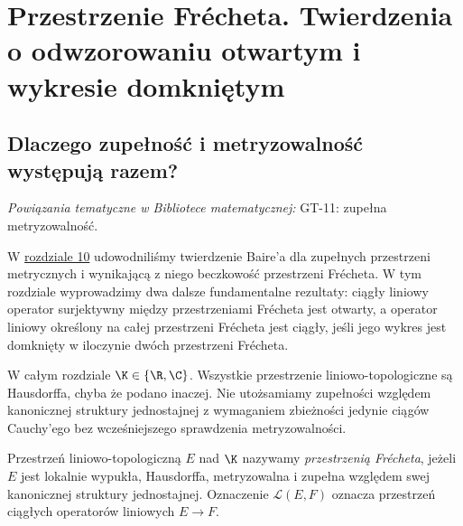 \setcounter{section}{10}
\section{Przestrzenie Frécheta. Twierdzenia o odwzorowaniu otwartym i wykresie domkniętym}\label{sec:frechet-open-graph}

\providecommand{\atlasref}[2]{#2}


\subsection{Dlaczego zupełność i metryzowalność występują razem?}

\noindent\emph{Powiązania tematyczne w Bibliotece matematycznej:} \atlasref{GT-11::def:topog-baire-zupelna-metryzowalnosc}{GT-11: zupełna metryzowalność}.


W \hyperref[sec:beczkowe-bornologiczne]{rozdziale 10} udowodniliśmy twierdzenie
Baire'a dla zupełnych przestrzeni metrycznych i wynikającą z niego
beczkowość przestrzeni Frécheta. W tym rozdziale wyprowadzimy dwa dalsze
fundamentalne rezultaty: ciągły liniowy operator surjektywny między
przestrzeniami Frécheta jest otwarty, a operator liniowy określony na
całej przestrzeni Frécheta jest ciągły, jeśli jego wykres jest domknięty
w iloczynie dwóch przestrzeni Frécheta.

W całym rozdziale $\K\in\{\R,\C\}$. Wszystkie przestrzenie
liniowo-topologiczne są Hausdorffa, chyba że podano inaczej.
Nie utożsamiamy zupełności względem kanonicznej struktury jednostajnej
z wymaganiem zbieżności jedynie ciągów Cauchy'ego bez wcześniejszego
sprawdzenia metryzowalności.

\begin{definicja}\label{def:frechet11}
Przestrzeń liniowo-topologiczną $E$ nad $\K$ nazywamy
\emph{przestrzenią Frécheta}, jeżeli $E$ jest lokalnie wypukła,
Hausdorffa, metryzowalna i zupełna względem swej kanonicznej
struktury jednostajnej. Oznaczenie $\mathcal L(E,F)$ oznacza
przestrzeń ciągłych operatorów liniowych $E\to F$.
\end{definicja}

